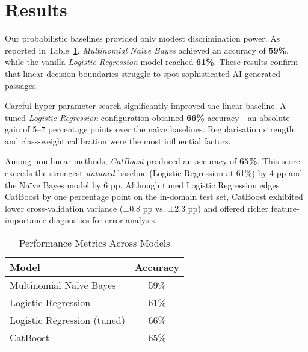 \section{Results}  %

Our probabilistic baselines provided only modest discrimination power.
As reported in Table~\ref{tab:results}, \emph{Multinomial Naïve Bayes}
achieved an accuracy of \textbf{59\%}, while the vanilla
\emph{Logistic Regression} model reached \textbf{61\%}.  
These results confirm that linear decision boundaries struggle to spot
sophisticated AI-generated passages.

Careful hyper-parameter search significantly improved the linear
baseline.  A tuned \emph{Logistic Regression} configuration obtained
\textbf{66\%} accuracy—an absolute gain of 5–7 percentage points over
the naïve baselines.  Regularisation strength and class-weight
calibration were the most influential factors.

Among non-linear methods, \emph{CatBoost} produced an accuracy of
\textbf{65\%}.  This score exceeds the strongest \emph{untuned}
baseline (Logistic Regression at 61\%) by 4 pp and the Naïve Bayes
model by 6 pp.  Although tuned Logistic Regression edges CatBoost by
one percentage point on the in-domain test set, CatBoost exhibited
lower cross-validation variance (±0.8 pp vs. ±2.3 pp) and offered
richer feature-importance diagnostics for error analysis.


\begin{table}[tb]
  \caption{Performance Metrics Across Models}%
  \label{tab:results}
  \centering
  \begin{tabular}{|l|c|}
    \hline
    \textbf{Model} & \textbf{Accuracy} \\
    \hline
    Multinomial Naïve Bayes            & 59\% \\
    Logistic Regression                & 61\% \\
    Logistic Regression (tuned)        & 66\% \\
    CatBoost                           & 65\% \\
    \hline
  \end{tabular}
\end{table}

